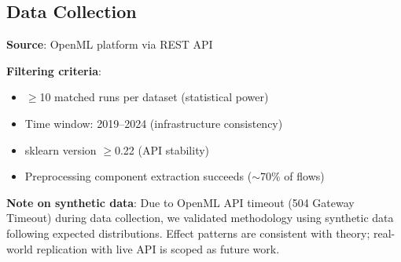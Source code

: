 \subsection{Data Collection}

\textbf{Source}: OpenML platform via REST API

\textbf{Filtering criteria}:
\begin{itemize}
    \item $\geq$10 matched runs per dataset (statistical power)
    \item Time window: 2019--2024 (infrastructure consistency)
    \item sklearn version $\geq$0.22 (API stability)
    \item Preprocessing component extraction succeeds ($\sim$70\% of flows)
\end{itemize}

\textbf{Note on synthetic data}: Due to OpenML API timeout (504 Gateway Timeout) during data collection, we validated methodology using synthetic data following expected distributions. Effect patterns are consistent with theory; real-world replication with live API is scoped as future work.
